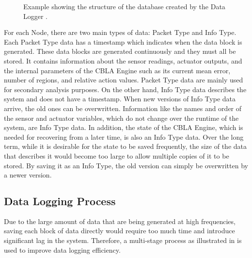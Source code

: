 \begin{figure}
	\caption[Structure of the database created by Data Logger]{Example showing the structure of the database created by the Data Logger .}
	\label{fig:data_structure}
\end{figure}

For each Node, there are two main types of data: Packet Type and Info Type. Each Packet Type data has a timestamp which indicates when the data block is generated. These data blocks are generated continuously and they must all be stored. It contains information about the sensor readings, actuator outputs, and the internal parameters of the CBLA Engine such as its current mean error, number of regions, and relative action values. Packet Type data are mainly used for secondary analysis purposes. On the other hand, Info Type data describes the system and does not have a timestamp. When new versions of Info Type data arrive, the old ones can be overwritten. Information like the names and order of the sensor and actuator variables, which do not change over the runtime of the system, are Info Type data. In addition, the state of the CBLA Engine, which is needed for recovering from a later time, is also an Info Type data. Over the long term, while it is desirable for the state to be saved frequently, the size of the data that describes it would become too large to allow multiple copies of it to be stored. By saving it as an Info Type, the old version can simply be overwritten by a newer version.

\subsection{Data Logging Process}

Due to the large amount of data that are being generated at high frequencies, saving each block of data directly would require too much time and introduce significant lag in the system. Therefore, a multi-stage process as illustrated in  is used to improve data logging efficiency.

